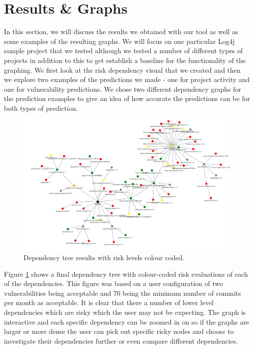 \documentclass[conference]{IEEEtran}
\begin{document}
\section{Results \& Graphs}
In this section, we will discuss the results we obtained with our tool as well as some examples of the resulting graphs. We will focus on one particular Log4j sample project \cite{noauthor_logging-log4j-sampleslog4j-server_nodate} that we tested although we tested a number of different types of projects in addition to this to get establish a baseline for the functionality of the graphing. We first look at the risk dependency visual that we created and then we explore two examples of the predictions we made - one for project activity and one for vulnerability predictions. We chose two different dependency graphs for the prediction examples to give an idea of how accurate the predictions can be for both types of prediction. 

\begin{figure}[H]
    \centering
    \includegraphics[width=1\linewidth]{dependency.png}
    \caption{Dependency tree results with risk levels colour coded.} 
    \label{fig:tree}
\end{figure}

Figure \ref{fig:tree} shows a final dependency tree with colour-coded risk evaluations of each of the dependencies. This figure was based on a user configuration of two vulnerabilities being acceptable and 70 being the minimum number of commits per month as acceptable. It is clear that there a number of lower level dependencies which are risky which the user may not be expecting. The graph is interactive and each specific dependency can be zoomed in on so if the graphs are larger or more dense the user can pick out specific risky nodes and choose to investigate their dependencies further or even compare different dependencies. 
\end{document}
